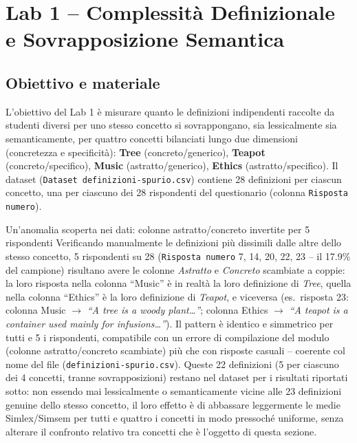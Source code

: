 \documentclass[12pt,a4paper]{article}
\begin{document}
\section{Lab 1 -- Complessit\`a Definizionale e Sovrapposizione Semantica}

\subsection{Obiettivo e materiale}

L'obiettivo del Lab 1 \`e misurare quanto le definizioni indipendenti raccolte da studenti diversi per uno stesso concetto si sovrappongano, sia lessicalmente sia semanticamente, per quattro concetti bilanciati lungo due dimensioni (concretezza e specificit\`a): \textbf{Tree} (concreto/generico), \textbf{Teapot} (concreto/specifico), \textbf{Music} (astratto/generico), \textbf{Ethics} (astratto/specifico). Il dataset (\texttt{Dataset definizioni-spurio.csv}) contiene 28 definizioni per ciascun concetto, una per ciascuno dei 28 rispondenti del questionario (colonna \texttt{Risposta numero}).

\begin{warnbox}{Un'anomalia scoperta nei dati: colonne astratto/concreto invertite per 5 rispondenti}
Verificando manualmente le definizioni pi\`u dissimili dalle altre dello stesso concetto, 5 rispondenti su 28 (\texttt{Risposta numero} 7, 14, 20, 22, 23 -- il 17.9\% del campione) risultano avere le colonne \emph{Astratto} e \emph{Concreto} scambiate a coppie: la loro risposta nella colonna ``Music'' \`e in realt\`a la loro definizione di \textit{Tree}, quella nella colonna ``Ethics'' \`e la loro definizione di \textit{Teapot}, e viceversa (es.\ risposta 23: colonna Music $\to$ \textit{``A tree is a woody plant\dots''}; colonna Ethics $\to$ \textit{``A teapot is a container used mainly for infusions\dots''}). Il pattern \`e identico e simmetrico per tutti e 5 i rispondenti, compatibile con un errore di compilazione del modulo (colonne astratto/concreto scambiate) pi\`u che con risposte casuali -- coerente col nome del file (\texttt{definizioni-spurio.csv}). Queste 22 definizioni (5 per ciascuno dei 4 concetti, tranne sovrapposizioni) restano nel dataset per i risultati riportati sotto: non essendo mai lessicalmente o semanticamente vicine alle 23 definizioni genuine dello stesso concetto, il loro effetto \`e di abbassare leggermente le medie Simlex/Simsem per tutti e quattro i concetti in modo pressoch\'e uniforme, senza alterare il confronto relativo tra concetti che \`e l'oggetto di questa sezione.
\end{warnbox}
\end{document}
